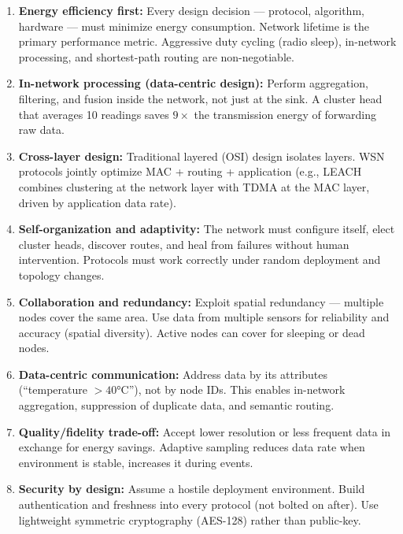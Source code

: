 \documentclass[12pt,a4paper]{article}
\begin{document}
\begin{tcolorbox}[formulabox, title={\textbf{Core WSN Design Principles}}]
\begin{enumerate}[leftmargin=*, itemsep=5pt]
  \item \textbf{Energy efficiency first:} Every design decision --- protocol, algorithm, hardware --- must minimize energy consumption. Network lifetime is the primary performance metric. Aggressive duty cycling (radio sleep), in-network processing, and shortest-path routing are non-negotiable.

  \item \textbf{In-network processing (data-centric design):} Perform aggregation, filtering, and fusion inside the network, not just at the sink. A cluster head that averages 10 readings saves $9\times$ the transmission energy of forwarding raw data.

  \item \textbf{Cross-layer design:} Traditional layered (OSI) design isolates layers. WSN protocols jointly optimize MAC + routing + application (e.g., LEACH combines clustering at the network layer with TDMA at the MAC layer, driven by application data rate).

  \item \textbf{Self-organization and adaptivity:} The network must configure itself, elect cluster heads, discover routes, and heal from failures without human intervention. Protocols must work correctly under random deployment and topology changes.

  \item \textbf{Collaboration and redundancy:} Exploit spatial redundancy --- multiple nodes cover the same area. Use data from multiple sensors for reliability and accuracy (spatial diversity). Active nodes can cover for sleeping or dead nodes.

  \item \textbf{Data-centric communication:} Address data by its attributes (``temperature $> 40$°C''), not by node IDs. This enables in-network aggregation, suppression of duplicate data, and semantic routing.

  \item \textbf{Quality/fidelity trade-off:} Accept lower resolution or less frequent data in exchange for energy savings. Adaptive sampling reduces data rate when environment is stable, increases it during events.

  \item \textbf{Security by design:} Assume a hostile deployment environment. Build authentication and freshness into every protocol (not bolted on after). Use lightweight symmetric cryptography (AES-128) rather than public-key.
\end{enumerate}
\end{tcolorbox}
\end{document}
